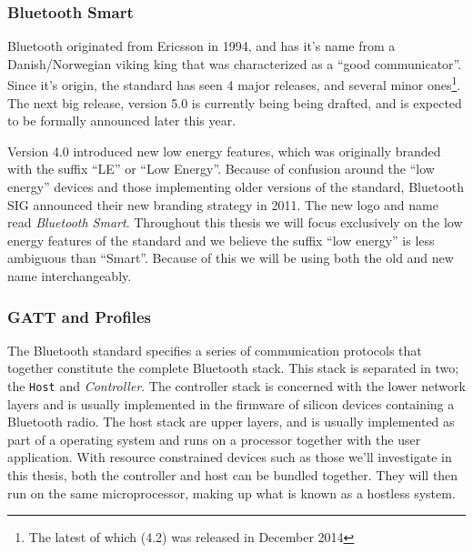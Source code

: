 \subsubsection{Bluetooth Smart} %
\label{ssub:bluetooth}

Bluetooth originated from Ericsson in 1994, and has it's name from a Danish/Norwegian viking king that was characterized as a ``good communicator''. Since it's origin, the standard has seen 4 major releases, and several minor ones\footnote{ The latest of which (4.2) was released in December 2014}. The next big release, version 5.0 is currently being being drafted, and is expected to be formally announced later this year. 

Version 4.0 introduced new low energy features, which was originally branded with the suffix ``LE'' or ``Low Energy''. Because of confusion around the ``low energy'' devices and those implementing older versions of the standard, Bluetooth SIG announced their new branding strategy in 2011. The new logo and name read \textit{Bluetooth Smart}. Throughout this thesis we will focus exclusively on the low energy features of the standard and we believe the suffix ``low energy'' is less ambiguous than ``Smart''. Because of this we will be using both the old and new name interchangeably.


\subsubsection{GATT and Profiles} %
\label{ssub:gatt_and_profiles}

The Bluetooth standard specifies a series of communication protocols that together  constitute the complete Bluetooth stack. This stack is separated in two; the \texttt{Host} and \emph{Controller}. The controller stack is concerned with the lower network layers and is usually implemented in the firmware of silicon devices containing a Bluetooth radio. The host stack are upper layers, and is usually implemented as part of a operating system and runs on a processor together with the user application. With resource constrained devices such as those we'll investigate in this thesis, both the controller and host can be bundled together. They will then run on the same microprocessor,  making up what is known as a hostless system.


